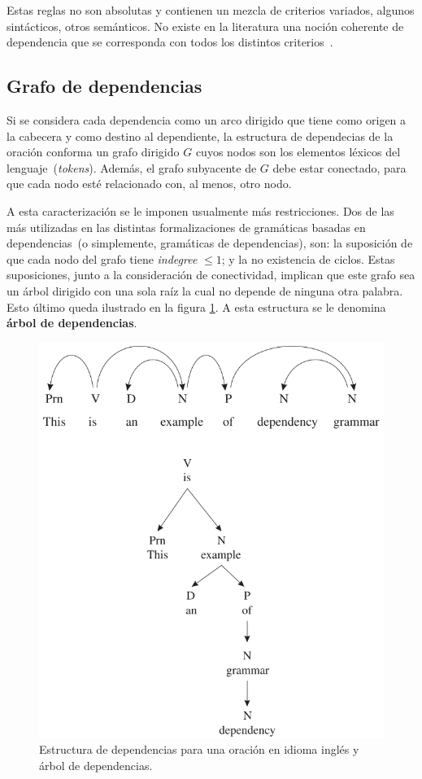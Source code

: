 Estas reglas no son absolutas y contienen un mezcla de criterios variados, algunos sintácticos, otros semánticos. No existe en la literatura una noción coherente de dependencia que se corresponda con todos los distintos criterios~\cite{nivre2005dependency}.


\subsection{Grafo de dependencias}

Si se considera cada dependencia como un arco dirigido que tiene como origen a la cabecera y como destino al dependiente, la estructura de dependecias de la oración conforma un grafo dirigido $G$ cuyos nodos son los elementos léxicos del lenguaje~(\emph{tokens}). Además, el grafo subyacente de $G$ debe estar conectado, para que cada nodo esté relacionado con, al menos, otro nodo.

A esta caracterización se le imponen usualmente más restricciones. Dos de las más utilizadas en las distintas formalizaciones de gramáticas basadas en dependencias~(o simplemente, gramáticas de dependencias), son: la suposición de que cada nodo del grafo tiene \emph{indegree} $\leq 1$; y la no existencia de ciclos. Estas suposiciones, junto a la consideración de conectividad, implican que este grafo sea un árbol dirigido con una sola raíz la cual no depende de ninguna otra palabra. Esto último queda ilustrado en la figura \ref{fig:dep_tree}. A esta estructura se le denomina \textbf{árbol de dependencias}.

\begin{figure}[h!]
	\centering
	\includegraphics[width=0.7\linewidth]{Graphics/dep_tree.png}
	\caption{Estructura de dependencias para una oración en idioma inglés y árbol de dependencias.}\label{fig:dep_tree}
\end{figure}

